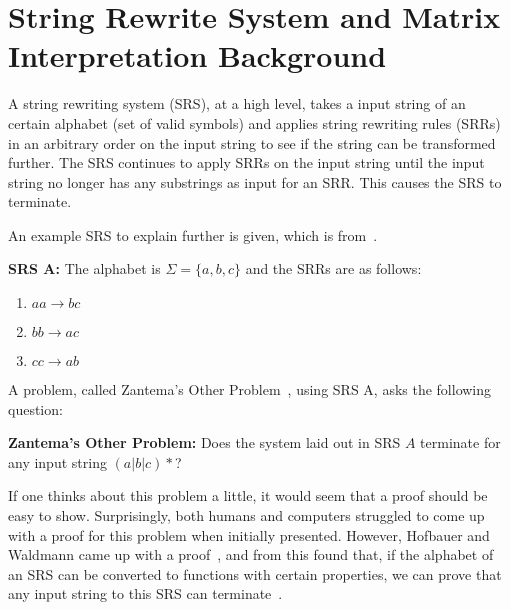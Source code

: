 \section{String Rewrite System and Matrix Interpretation Background}
A string rewriting system (SRS), at a high level, takes a input string of an certain alphabet (set of valid symbols) and applies string rewriting rules (SRRs) in an arbitrary order on the input string to see if the string can be transformed further. The SRS continues to apply SRRs on the input string until the input string no longer has any substrings as input for an SRR. This causes the SRS to terminate. \par
An example SRS to explain further is given, which is from~\cite{HeuleAaronson}.\par\noindent
\textbf{SRS A:} The alphabet is $\Sigma = \{a, b, c\}$ and the SRRs are as follows:
\begin{enumerate}
    \item $aa \rightarrow bc$
    \item $bb \rightarrow ac$
    \item $cc \rightarrow ab$
\end{enumerate}
A problem, called Zantema's Other Problem~\cite{Hofbauer:2006:TA:1142725.1711178}, using SRS A, asks the following question:\par\noindent
\textbf{Zantema's Other Problem:}
Does the system laid out in SRS $A$ terminate for any input string $(a|b|c)*$?\par
If one thinks about this problem a little, it would seem that a proof should be easy to show.  Surprisingly, both humans and computers struggled to come up with a proof for this problem when initially presented.  However, Hofbauer and Waldmann came up with a proof~\cite{Hofbauer:2006:TA:1142725.1711178}, and from this found that, if the alphabet of an SRS can be converted to functions with certain properties, we can prove that any input string to this SRS can terminate~\cite{Hofbauer2006}. 

